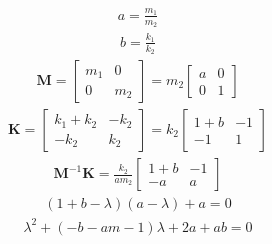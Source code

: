 \documentclass[letterpaper,10pt,english]{sphinxmanual}
\let\sphinxpxdimen\pdfpxdimen\else\newdimen\sphinxpxdimen
\begin{document}
\noindent\sphinxincludegraphics[width=3699\sphinxpxdimen,height=1192\sphinxpxdimen]{{2dof}.png}
\begin{equation*}
\begin{split}a = \frac{m_{1}}{m_{2}}\end{split}
\end{equation*}\begin{equation*}
\begin{split}b = \frac{k_{1}}{k_{2}}\end{split}
\end{equation*}\begin{equation*}
\begin{split}\mathbf{M} = \begin{bmatrix} m_{1} & 0 \\ 0 & m_{2} \end{bmatrix} = m_{2}\begin{bmatrix} a & 0 \\ 0 & 1 \end{bmatrix}\end{split}
\end{equation*}\begin{equation*}
\begin{split}\mathbf{K} = \begin{bmatrix} k_{1}+k_{2} & -k_{2} \\ -k_{2} & k_{2} \end{bmatrix} = k_{2} \begin{bmatrix} 1+b & -1 \\ -1 & 1 \end{bmatrix}\end{split}
\end{equation*}\begin{equation*}
\begin{split}\mathbf{M}^{-1}\mathbf{K} = \frac{k_{2}}{am_{2}}\begin{bmatrix} 1+b & -1 \\ -a & a \end{bmatrix}\end{split}
\end{equation*}\begin{equation*}
\begin{split}(1+b-\lambda)(a-\lambda)+a = 0\end{split}
\end{equation*}\begin{equation*}
\begin{split}\lambda^{2}+(-b-a{m}-1)\lambda+2a+ab = 0\end{split}

\end{equation*}
\end{document}
